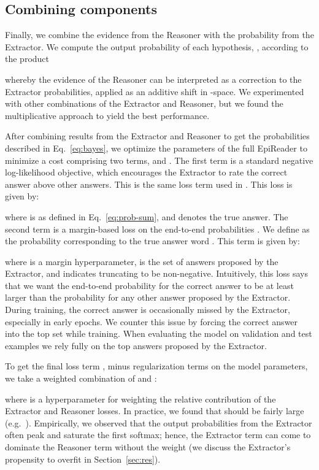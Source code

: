 \documentclass[11pt,letterpaper]{article}
\begin{document}
\subsection{Combining components}
Finally, we combine the evidence from the Reasoner with the probability from the Extractor.
We compute the output probability of each hypothesis, , according to the product

whereby the evidence of the Reasoner can be interpreted as a correction to the Extractor probabilities, applied as an additive shift in -space.
We experimented with other combinations of the Extractor and Reasoner, but we found the multiplicative approach to yield the best performance. 

After combining results from the Extractor and Reasoner to get the probabilities  described in Eq.~\ref{eq:bayes}, we optimize the parameters of the full EpiReader to minimize a cost comprising two terms,  and . The first term is a standard negative log-likelihood objective, which encourages the Extractor to rate the correct answer above other answers. This is the same loss term used in . This loss is given by:

where  is as defined in Eq.~\ref{eq:prob-sum}, and  denotes the true answer. The second term is a margin-based loss on the end-to-end probabilities . We define  as the probability  corresponding to the true answer word . This term is given by:

where  is a margin hyperparameter,  is the set of  answers proposed by the Extractor, and  indicates truncating  to be non-negative. Intuitively, this loss says that we want the end-to-end probability  for the correct answer to be at least  larger than the probability  for any other answer proposed by the Extractor. During training, the correct answer is occasionally missed by the Extractor, especially in early epochs. We counter this issue by forcing the correct answer into the top  set while training. When evaluating the model on validation and test examples we rely fully on the top  answers proposed by the Extractor.

To get the final loss term , minus  regularization terms on the model parameters, we take a weighted combination of  and :

where  is a hyperparameter for weighting the relative contribution of the Extractor and Reasoner losses. In practice, we found that  should be fairly large (e.g.~).
Empirically, we observed that the output probabilities from the Extractor often peak and saturate the first softmax; hence, the Extractor term can come to dominate the Reasoner term without the weight  (we discuss the Extractor's propensity to overfit in Section~\ref{sec:res}).
\end{document}
